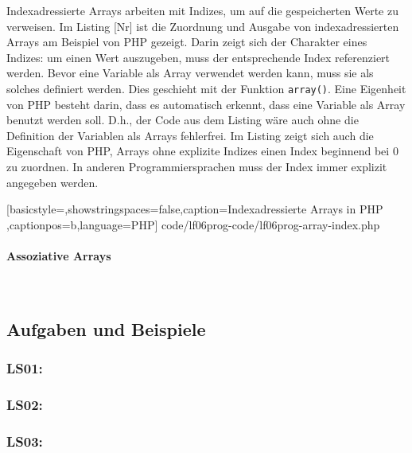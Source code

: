 Indexadressierte Arrays arbeiten mit Indizes, um auf die gespeicherten Werte zu verweisen. Im Listing [Nr] ist die Zuordnung und Ausgabe von indexadressierten Arrays am Beispiel von PHP gezeigt. Darin zeigt sich der Charakter eines Indizes: um einen Wert auszugeben, muss der entsprechende Index referenziert werden. Bevor eine Variable als Array verwendet werden kann, muss sie als solches definiert werden. Dies geschieht mit der Funktion \texttt{array()}. Eine Eigenheit von PHP besteht darin, dass es automatisch erkennt, dass eine Variable als Array benutzt werden soll. D.h., der Code aus dem Listing wäre auch ohne die Definition der Variablen als Arrays fehlerfrei. Im Listing zeigt sich auch die Eigenschaft von PHP, Arrays ohne explizite Indizes einen Index beginnend bei $0$ zu zuordnen. In anderen Programmiersprachen muss der Index immer explizit angegeben werden.


	[basicstyle=\small,showstringspaces=false,caption={Indexadressierte Arrays in PHP}
	\label{lst:array-index},captionpos=b,language=PHP]
	{code/lf06prog-code/lf06prog-array-index.php}

\paragraph{Assoziative Arrays}~\\


\subsection{Aufgaben und Beispiele}

\subsubsection{LS01: }

\subsubsection{LS02: }

\subsubsection{LS03: }

